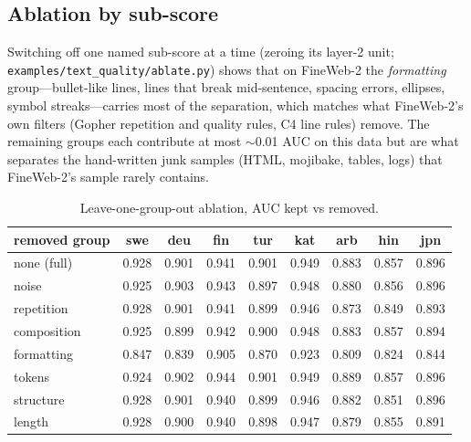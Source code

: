 \subsection{Ablation by sub-score}
Switching off one named sub-score at a time (zeroing its layer-2 unit;
\texttt{examples/text\_quality/ablate.py}) shows that on FineWeb-2 the
\emph{formatting} group---bullet-like lines, lines that break mid-sentence,
spacing errors, ellipses, symbol streaks---carries most of the separation,
which matches what FineWeb-2's own filters (Gopher repetition and quality rules,
C4 line rules) remove. The remaining groups each contribute at most
$\sim$0.01 AUC on this data but are what separates the hand-written junk
samples (HTML, mojibake, tables, logs) that FineWeb-2's sample rarely contains.

\begin{table}[h]\centering\small
\begin{tabular}{lcccccccc}\toprule
removed group & swe & deu & fin & tur & kat & arb & hin & jpn \\\midrule
none (full)  & 0.928 & 0.901 & 0.941 & 0.901 & 0.949 & 0.883 & 0.857 & 0.896 \\
noise        & 0.925 & 0.903 & 0.943 & 0.897 & 0.948 & 0.880 & 0.856 & 0.896 \\
repetition   & 0.928 & 0.901 & 0.941 & 0.899 & 0.946 & 0.873 & 0.849 & 0.893 \\
composition  & 0.925 & 0.899 & 0.942 & 0.900 & 0.948 & 0.883 & 0.857 & 0.894 \\
formatting   & 0.847 & 0.839 & 0.905 & 0.870 & 0.923 & 0.809 & 0.824 & 0.844 \\
tokens       & 0.924 & 0.902 & 0.944 & 0.901 & 0.949 & 0.889 & 0.857 & 0.896 \\
structure    & 0.928 & 0.901 & 0.940 & 0.899 & 0.946 & 0.882 & 0.851 & 0.896 \\
length       & 0.928 & 0.900 & 0.940 & 0.898 & 0.947 & 0.879 & 0.855 & 0.891 \\
\bottomrule\end{tabular}
\caption{Leave-one-group-out ablation, AUC kept vs removed.}
\end{table}
